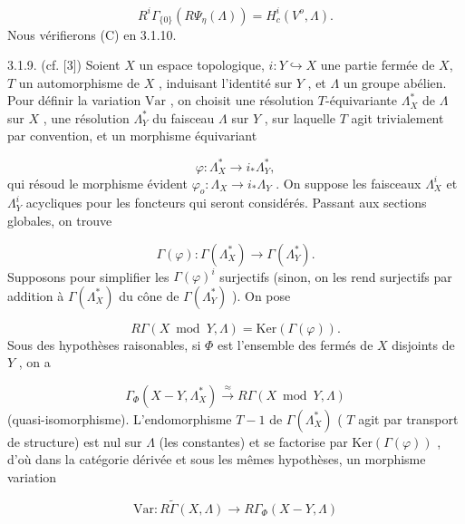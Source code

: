 
\begin{equation}\tag{3.1.8.6}
 R^i\Gamma_{\{0\}}(R\Psi_\eta(\Lambda)) = H^i_c(V^o, \Lambda) .
\end{equation}
Nous vérifierons (C) en 3.1.10.

3.1.9. (cf. [3]) Soient $X$ un espace topologique, $i : Y \hookrightarrow X$ une partie fermée de $X$, $T$ un automorphisme de $X$ , induisant l'identité sur $Y$ , et $\Lambda$ un groupe abélien. Pour définir la variation $\mathrm{Var}$ , on choisit une résolution $T$-équivariante $\Lambda^*_X$ de $\Lambda$ sur $X$ , une résolution $\Lambda^*_Y$ du faisceau $\Lambda$ sur $Y$ , sur laquelle $T$ agit trivialement par convention, et un morphisme équivariant

\begin{equation*}
\varphi : \Lambda^*_X \longrightarrow i_*\Lambda^*_Y ,
\end{equation*}
qui résoud le morphisme évident $\varphi_o : \Lambda_X \longrightarrow i_* \Lambda_Y$ . On suppose les faisceaux $\Lambda^i_X$ et $\Lambda^i_Y$ acycliques pour les foncteurs qui seront considérés. Passant aux sections globales, on trouve

\begin{equation*}
\Gamma(\varphi) : \Gamma(\Lambda^*_X) \longrightarrow \Gamma(\Lambda^*_Y) .
\end{equation*}
Supposons pour simplifier les $\Gamma(\varphi)^i$ surjectifs (sinon, on les rend surjectifs par addition à $\Gamma(\Lambda^*_X)$ du cône de $\Gamma(\Lambda^*_Y)$ ). On pose

\begin{equation*}
R\Gamma (X \bmod Y, \Lambda) = \mathrm{Ker}(\Gamma (\varphi)) .
\end{equation*}
Sous des hypothèses raisonables, si $\Phi$ est l'ensemble des fermés de $X$ disjoints de $Y$ , on a

\begin{equation*}
\Gamma_\Phi(X-Y, \Lambda^*_X) \overset{\approx}{\longrightarrow} R\Gamma (X \bmod Y, \Lambda)
\end{equation*}
(quasi-isomorphisme). L'endomorphisme $T-1$ de $\Gamma(\Lambda^*_X)$ ( $T$ agit par transport de structure) est nul sur $\Lambda$ (les constantes) et se factorise par $\mathrm{Ker}(\Gamma (\varphi))$ , d'où dans la catégorie dérivée et sous les mêmes hypothèses, un morphisme variation

\begin{equation*}
\mathrm{Var} : R\widetilde{\Gamma} (X, \Lambda) \longrightarrow R\Gamma_\Phi (X-Y, \Lambda) 
\end{equation*}


